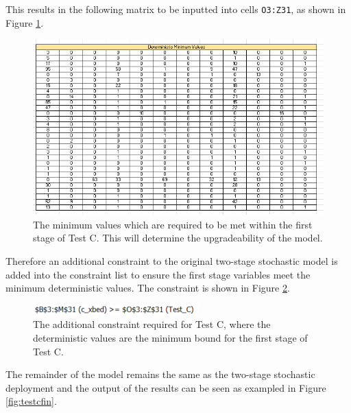 \documentclass[../thesis.tex]{subfiles}
\begin{document}
This results in the following matrix to be inputted into cells \texttt{O3:Z31}, as shown in Figure \ref{fig:TestC}.

\begin{figure}
    \centering
    \includegraphics[width=\textwidth]{Chapters/Chapter7/Figures/TestC.png}
    \caption{The minimum values which are required to be met within the first stage of Test C. This will determine the upgradeability of the model.}
    \label{fig:TestC}
\end{figure}

Therefore an additional constraint to the original two-stage stochastic model is added into the constraint list to ensure the first stage variables meet the minimum deterministic values. The constraint is shown in Figure \ref{fig:testCcon}.

\begin{figure}
    \centering
    \includegraphics{Chapters/Chapter7/Figures/TestCcon.png}
    \caption{The additional constraint required for Test C, where the deterministic values are the minimum bound for the first stage of Test C.}
    \label{fig:testCcon}
\end{figure}

The remainder of the model remains the same as the two-stage stochastic deployment and the output of the results can be seen as exampled in Figure \ref{fig:testcfin}.
\end{document}
